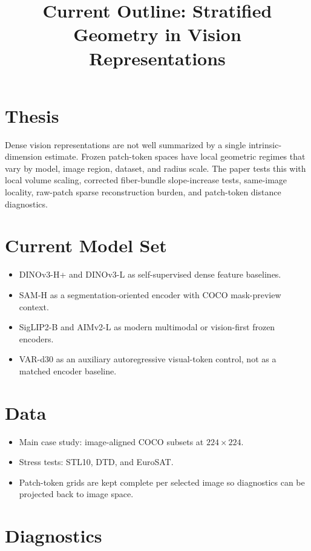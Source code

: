 \documentclass{article}
\title{Current Outline: Stratified Geometry in Vision Representations}
\date{}
\begin{document}
\maketitle

\section*{Thesis}

Dense vision representations are not well summarized by a single intrinsic-dimension estimate. Frozen patch-token spaces have local geometric regimes that vary by model, image region, dataset, and radius scale. The paper tests this with local volume scaling, corrected fiber-bundle slope-increase tests, same-image locality, raw-patch sparse reconstruction burden, and patch-token distance diagnostics.

\section*{Current Model Set}

\begin{itemize}[leftmargin=1.5em]
\item DINOv3-H+ and DINOv3-L as self-supervised dense feature baselines.
\item SAM-H as a segmentation-oriented encoder with COCO mask-preview context.
\item SigLIP2-B and AIMv2-L as modern multimodal or vision-first frozen encoders.
\item VAR-d30 as an auxiliary autoregressive visual-token control, not as a matched encoder baseline.
\end{itemize}

\section*{Data}

\begin{itemize}[leftmargin=1.5em]
\item Main case study: image-aligned COCO subsets at $224\times224$.
\item Stress tests: STL10, DTD, and EuroSAT.
\item Patch-token grids are kept complete per selected image so diagnostics can be projected back to image space.
\end{itemize}

\section*{Diagnostics}
\end{document}
